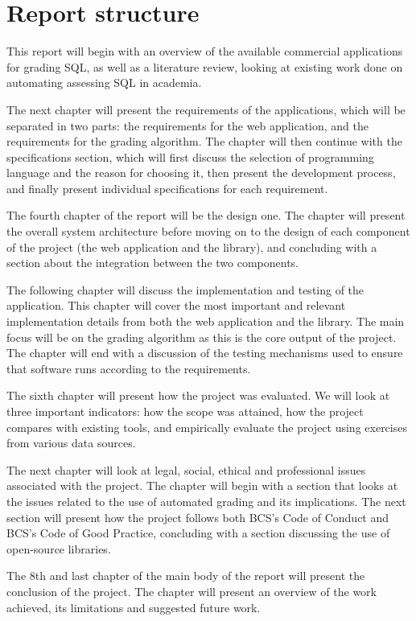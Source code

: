 \section{Report structure}

This report will begin with an overview of the available commercial applications for grading SQL, as well as a literature review, looking at existing work done on automating assessing SQL in academia.

The next chapter will present the requirements of the applications, which will be separated in two parts: the requirements for the web application, and the requirements for the grading algorithm. The chapter will then continue with the specifications section, which will first discuss the selection of programming language and the reason for choosing it, then present the development process, and finally present individual specifications for each requirement.

The fourth chapter of the report will be the design one. The chapter will present the overall system architecture before moving on to the design of each component of the project (the web application and the library), and concluding with a section about the integration between the two components.

The following chapter will discuss the implementation and testing of the application. This chapter will cover the most important and relevant implementation details from both the web application and the library. The main focus will be on the grading algorithm as this is the core output of the project. The chapter will end with a discussion of the testing mechanisms used to ensure that software runs according to the requirements.

The sixth chapter will present how the project was evaluated. We will look at three important indicators: how the scope was attained, how the project compares with existing tools, and empirically evaluate the project using exercises from various data sources.

The next chapter will look at legal, social, ethical and professional issues associated with the project. The chapter will begin with a section that looks at the issues related to the use of automated grading and its implications. The next section will present how the project follows both BCS's Code of Conduct and BCS's Code of Good Practice, concluding with a section discussing the use of open-source libraries.

The 8th and last chapter of the main body of the report will present the conclusion of the project. The chapter will present an overview of the work achieved, its limitations and suggested future work.